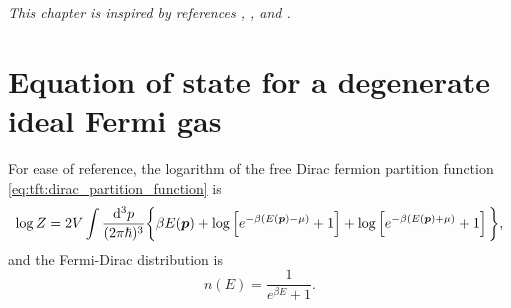 \textit{This chapter is inspired by references \cite{ref:jensoluf}, \cite{ref:glendenning}, \cite{ref:mtw} and \cite{ref:stability_methods}.}

\section{Equation of state for a degenerate ideal Fermi gas}

For ease of reference, the logarithm of the free Dirac fermion partition function \eqref{eq:tft:dirac_partition_function} is
\begin{equation}
	\log Z = 2 V \int \frac{\mathop{}\!\mathrm{d}^3 p}{(2 \pi \hbar)^3} \bigg\{ \beta E({\bm{p}}) + \log \left[ e^{-\beta (E({\bm{p}}) - \mu)}+1 \right] + \log \left[ e^{-\beta (E({\bm{p}}) + \mu)} + 1\right] \bigg\},
\end{equation}
and the Fermi-Dirac distribution is
\begin{equation}
	n(E) = \frac{1}{e^{\beta E} + 1}.
\label{eq:nstars:fermi_dirac_distribution}
\end{equation}

